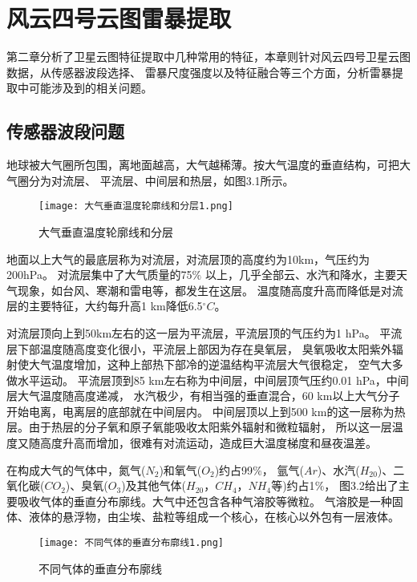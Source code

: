 
\chapter{风云四号云图雷暴提取}
第二章分析了卫星云图特征提取中几种常用的特征，本章则针对风云四号卫星云图数据，从传感器波段选择、
雷暴尺度强度以及特征融合等三个方面，分析雷暴提取中可能涉及到的相关问题。

\section{传感器波段问题}
地球被大气圈所包围，离地面越高，大气越稀薄。按大气温度的垂直结构，可把大气圈分为对流层、
平流层、中间层和热层，如图3.1所示。

\begin{figure}[htb]
    \centering
    \texttt{[image: 大气垂直温度轮廓线和分层1.png]}
    \caption{大气垂直温度轮廓线和分层}
\end{figure}
地面以上大气的最底层称为对流层，对流层顶的高度约为10km，气压约为200hPa。
对流层集中了大气质量的75$\%$
以上，几乎全部云、水汽和降水，主要天气现象，如台风、寒潮和雷电等，都发生在这层。
温度随高度升高而降低是对流层的主要特征，大约每升高1 km降低6.5$^\circ C$。

对流层顶向上到50km左右的这一层为平流层，平流层顶的气压约为1 hPa。 
平流层下部温度随高度变化很小，平流层上部因为存在臭氧层，
臭氧吸收太阳紫外辐射使大气温度增加，这种上部热下部冷的逆温结构平流层大气很稳定，
空气大多做水平运动。
平流层顶到85 km左右称为中间层，中间层顶气压约0.01 hPa，中间层大气温度随高度递减，
水汽极少，有相当强的垂直混合，60 km以上大气分子开始电离，电离层的底部就在中间层内。
中间层顶以上到500 km的这一层称为热层。由于热层的分子氧和原子氧能吸收太阳紫外辐射和微粒辐射，
所以这一层温度又随高度升高而增加，很难有对流运动，造成巨大温度梯度和昼夜温差。

在构成大气的气体中，氮气($N_2$)和氧气($O_2$)约占99$\%$，
氩气($Ar$)、水汽($H_20$)、二氧化碳($CO_2$)、臭氧($O_3$)及其他气体($H_20$，$CH_4$，$NH_4$等)约占1$\%$，
图3.2给出了主要吸收气体的垂直分布廓线。大气中还包含各种气溶胶等微粒。
气溶胶是一种固体、液体的悬浮物，由尘埃、盐粒等组成一个核心，在核心以外包有一层液体。

\begin{figure}[htb]
    \centering
    \texttt{[image: 不同气体的垂直分布廓线1.png]}
    \caption{不同气体的垂直分布廓线}
\end{figure}

